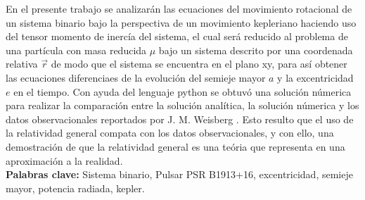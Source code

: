 En el presente trabajo se analizarán las ecuaciones del movimiento rotacional de un sistema binario bajo la perspectiva
de un movimiento kepleriano haciendo uso del tensor momento de inercía del sistema, el cual será reducido al problema de una partícula
con masa reducida $\mu$ bajo un sistema descrito por una coordenada relativa $\vec{r}$ de modo que el sistema se encuentra en el plano xy, 
para así obtener las ecuaciones diferenciaes de la evolución del semieje mayor $a$ y la excentricidad $e$ en el tiempo. Con ayuda del lenguaje
python se obtuvó una solución númerica para realizar la comparación entre la solución analítica, la solución númerica y los datos observacionales reportados por 
J. M. Weisberg \cite{Weisberg2010}. Esto resulto que el uso de la relatividad general compata con los datos observacionales, y con ello, 
una demostración de que la  relatividad general es una teória que representa en una aproximación a la realidad.\\
\textbf{Palabras clave:} Sistema binario, Pulsar PSR B1913+16, excentricidad, semieje mayor, potencia radiada, kepler.